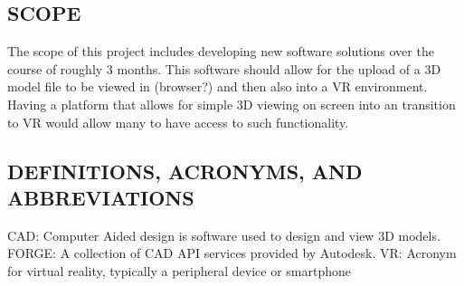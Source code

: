 \documentclass[letterpaper, 10pt, draftclsnofoot, onecolumn]{IEEEtran}
\begin{document}
\begin{comment}
\subsection[PURPOSE]{\selectlanguage{english}\rmfamily\bfseries\color{black}
PURPOSE}
{\selectlanguage{english}\itshape\color{black}
This paragraph shall contain a brief statement on the purpose of the
system and software being developed, and the intended audience for this
document.}

{\selectlanguage{english}\color{black}
The purpose of the system under development is to [ insert your text
here ]. \ While the system will be used by [ insert intended users ],
this document is intended to be read and understood by UICS software
designers and coders. \ [ Optional: The document will also be vetted or
approved by [ insert approval people ]].}
\end{comment}



\subsection[SCOPE]{\rmfamily\bfseries\color{black}
SCOPE}
{\color{black}
The scope of this project includes developing new software solutions over the course of roughly 3 months. This software should allow for the upload of a 3D model file to be viewed in (browser?) and then also into a VR environment. Having a platform that allows for simple 3D viewing on screen into an transition to VR would allow many to have access to such functionality. }

\subsection[DEFINITIONS, ACRONYMS, AND
ABBREVIATIONS]{\rmfamily\bfseries\color{black}
DEFINITIONS, ACRONYMS, AND ABBREVIATIONS}
{\color{black}
CAD: Computer Aided design is software used to design and view 3D models. 
FORGE: A collection of CAD API services provided by Autodesk.
VR: Acronym for virtual reality, typically a peripheral device or smartphone
}
\end{document}
